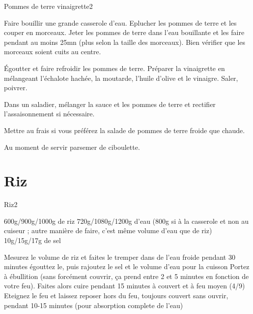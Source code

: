 {\begin{recette}{Pommes de terre vinaigrette}{2}{}{}
\begin{preparation}
\etape Faire bouillir une grande casserole d'eau. Eplucher les pommes de terre et les couper en morceaux. Jeter les pommes de 
terre dans l'eau bouillante et les faire pendant au moins 25mn (plus selon la taille des morceaux). Bien vérifier que les 
morceaux soient cuits au centre.

\etape Égoutter et faire refroidir les pommes de terre. Préparer la vinaigrette en mélangeant l'échalote hachée, la moutarde, 
l'huile d'olive et le vinaigre. Saler, poivrer.

\etape Dans un saladier, mélanger la sauce et les pommes de terre et rectifier l'assaisonnement si nécessaire.

\begin{remarque}
Mettre au frais si vous préférez la salade de pommes de terre froide que chaude.
\end{remarque}

\etape Au moment de servir parsemer de ciboulette.
\end{preparation}
\end{recette}

\section{Riz}
\begin{recette}{Riz}{2}{}{}\label{sec:riz}
\begin{ingredients}
\ingredient 600g/900g/1000g de riz
\ingredient 720g/1080g/1200g d'eau (800g si à la casserole et non au cuiseur ; autre manière de faire, c'est même volume d'eau que de riz)
\ingredient 10g/15g/17g de sel
\end{ingredients}

\begin{preparation}
\etape Mesurez le volume de riz et faites le tremper dans de l'eau froide pendant 30 minutes
\etape égouttez le, puis rajoutez le sel et le volume d'eau pour la cuisson
\etape Portez à ébullition (sans forcément couvrir, ça prend entre 2 et 5 minutes en fonction de votre feu).
\etape Faites alors cuire pendant 15 minutes à couvert et à feu moyen (4/9)
\etape Eteignez le feu et laissez reposer hors du feu, toujours couvert sans ouvrir, pendant 10-15 minutes (pour absorption complete de l'eau)
\end{preparation}
\end{recette}

}
